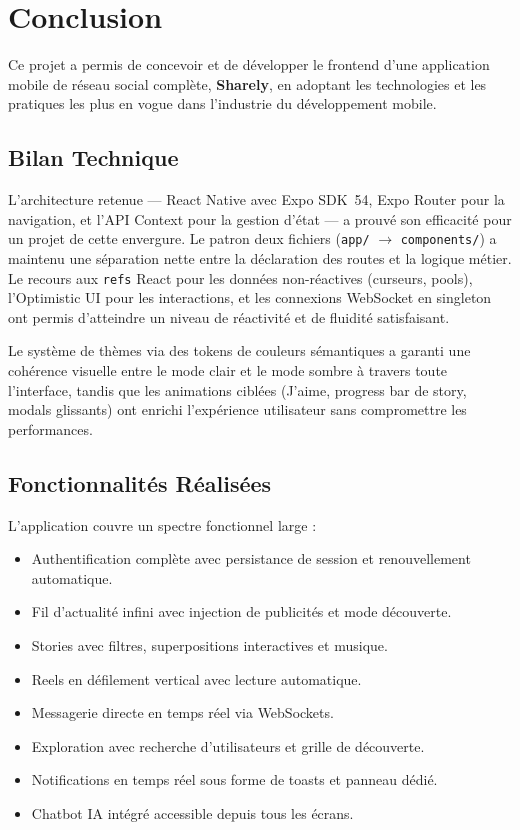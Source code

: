 \chapter*{Conclusion}


Ce projet a permis de concevoir et de développer le frontend d'une application mobile de réseau social complète, \textbf{Sharely}, en adoptant les technologies et les pratiques les plus en vogue dans l'industrie du développement mobile.

\section*{Bilan Technique}

L'architecture retenue --- React Native avec Expo SDK~54, Expo Router pour la navigation, et l'API Context pour la gestion d'état --- a prouvé son efficacité pour un projet de cette envergure. Le patron deux fichiers (\texttt{app/} $\to$ \texttt{components/}) a maintenu une séparation nette entre la déclaration des routes et la logique métier. Le recours aux \texttt{refs} React pour les données non-réactives (curseurs, pools), l'Optimistic UI pour les interactions, et les connexions WebSocket en singleton ont permis d'atteindre un niveau de réactivité et de fluidité satisfaisant.

Le système de thèmes via des tokens de couleurs sémantiques a garanti une cohérence visuelle entre le mode clair et le mode sombre à travers toute l'interface, tandis que les animations ciblées (J'aime, progress bar de story, modals glissants) ont enrichi l'expérience utilisateur sans compromettre les performances.

\section*{Fonctionnalités Réalisées}

L'application couvre un spectre fonctionnel large :
\begin{itemize}[leftmargin=1.5em, itemsep=0.2em]
    \item Authentification complète avec persistance de session et renouvellement automatique.
    \item Fil d'actualité infini avec injection de publicités et mode découverte.
    \item Stories avec filtres, superpositions interactives et musique.
    \item Reels en défilement vertical avec lecture automatique.
    \item Messagerie directe en temps réel via WebSockets.
    \item Exploration avec recherche d'utilisateurs et grille de découverte.
    \item Notifications en temps réel sous forme de toasts et panneau dédié.
    \item Chatbot IA intégré accessible depuis tous les écrans.
\end{itemize}

